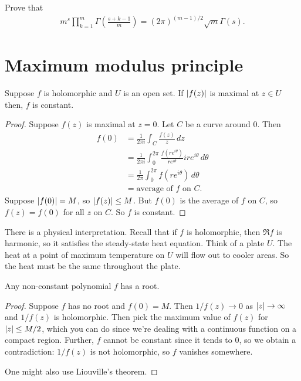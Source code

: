 \documentclass[11pt, oneside,margin=1in]{article}
\begin{document}
 \begin{exercise}\label{extend it}\text{}
Prove that
\begin{align*}
	m^s \prod_{k=1}^m \Gamma \left(\frac{s+ k - 1}{m} \right) = (2\pi)^{ (m-1)/2} \sqrt m \Gamma (s).
\end{align*}
\end{exercise}

\section{Maximum modulus principle}

Suppose $f$ is holomorphic and $U$ is an open set. If $\left \lvert f(z) \right \rvert$ is maximal at $z\in U$ then, $f$ is constant.

\begin{proof}
Suppose $f(z)$ is maximal at $z=0$. Let $C$ be a curve around $0$. Then
 \begin{align*}
	 f(0)& = \frac{1}{2\pi i} \int_C \frac{f (z)}{z}\, dz\\ 
	     &= \frac{1}{2\pi i} \int_0^{2\pi} \frac{f(re^{i\theta})}{re^{i\theta}} ire^{i\theta}\, d\theta\\
	     &= \frac{1}{2\pi} \int_0^{2\pi} f (re^{i\theta}) \, d\theta\\
	     &= \textrm{average of $f$ on $C$.}
\end{align*}
Suppose $\left \lvert f(0) \right \rvert = M$, so $\left \lvert f(z) \right \rvert\le M$. But $f(0)$ is the average of $f$ on $C$, so $f(z)=f (0)$ for all $z$ on $C$. So $f$ is constant. 
\end{proof}

There is a physical interpretation. Recall that if $f$ is holomorphic, then $\Re f$ is harmonic, so it satisfies the steady-state heat equation. Think of a plate $U$. The heat at a point of maximum temperature on $U$ will flow out to cooler areas. So the heat must be the same throughout the plate.

\begin{theorem}\label{}\index{}\text{}
Any non-constant polynomial $f$ has a root.
\end{theorem}
\begin{proof}
Suppose $f$ has no root and $f(0)=M$. Then $1/f(z)\to 0$ as $\left \lvert z \right \rvert \to\infty$ and $1/f(z)$ is holomorphic. Then pick the maximum value of $f(z)$ for $\left \lvert z \right \rvert\le M/2$, which you can do since we're dealing with a continuous function on a compact region. Further, $f$ cannot be constant since it tends to $0$, so we obtain a contradiction: $1/f(z)$ is not holomorphic, so $f$ vanishes somewhere.

One might also use Liouville's theorem.
\end{proof}
\end{document}
